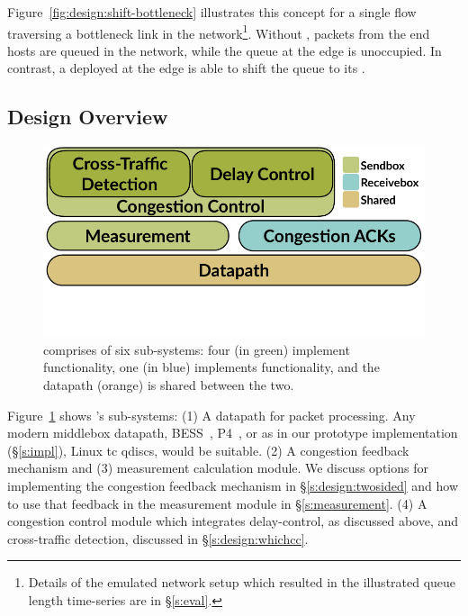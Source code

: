 Figure~\ref{fig:design:shift-bottleneck} illustrates this concept for a single flow traversing a bottleneck link in the 
network\footnote{Details of the emulated network setup which resulted in the illustrated queue length time-series are in \S\ref{s:eval}.}.
Without \name, packets from the end hosts are queued in the network, while the queue at the edge is unoccupied. 
In contrast, a \name deployed at the edge is able to shift the queue to its \inbox.

\subsection{Design Overview}\label{s:design:overview}
\begin{figure}
    \centering
    \includegraphics[width=\columnwidth]{img/arch-block-diag}
    \vspace{-40pt}
    \caption{\name comprises of six sub-systems: four (in green) implement \inbox functionality, one (in blue) implements \outbox functionality, and the datapath (orange) is shared between the two.}\label{fig:design:block-diag}
\end{figure}

Figure~\ref{fig:design:block-diag} shows \name's sub-systems: 
(1) A datapath for packet processing. Any modern middlebox datapath, \eg BESS~\cite{bess}, P4~\cite{p4}, or as in our prototype implementation (\S\ref{s:impl}), Linux tc qdiscs, would be suitable.
(2) A congestion feedback mechanism and (3) measurement calculation module. We discuss options for implementing the congestion feedback mechanism in \S\ref{s:design:twosided} and how to use that feedback in the measurement module in \S\ref{s:measurement}.
(4) A congestion control module which integrates delay-control, as discussed above, and cross-traffic detection, discussed in \S\ref{s:design:whichcc}.


